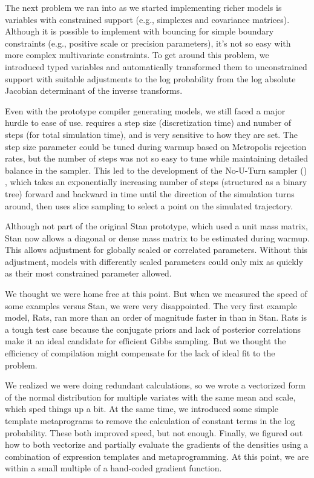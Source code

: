 The next problem we ran into as we started implementing richer models
is variables with constrained support (e.g., simplexes and covariance
matrices).  Although it is possible to implement \HMC with bouncing
for simple boundary constraints (e.g., positive scale or precision
parameters), it's not so easy with more complex multivariate
constraints.  To get around this problem, we introduced typed
variables and automatically transformed them to unconstrained support
with suitable adjustments to the log probability from the log absolute
Jacobian determinant of the inverse transforms.

Even with the prototype compiler generating models, we still faced a
major hurdle to ease of use.  \HMC requires a step size
(discretization time) and number of steps (for total simulation time),
and is very sensitive to how they are set.  The step size parameter
could be tuned during warmup based on Metropolis rejection rates, but
the number of steps was not so easy to tune while maintaining detailed
balance in the sampler.  This led to the development of the No-U-Turn
sampler (\NUTS) \citep{Hoffman-Gelman:2011, Hoffman-Gelman:2014},
which takes an exponentially increasing number of steps (structured as
a binary tree) forward and backward in time until the direction of the
simulation turns around, then uses slice sampling to select a point on
the simulated trajectory.

Although not part of the original Stan prototype, which used a unit
mass matrix, Stan now allows a diagonal or dense mass matrix to be
estimated during warmup.  This allows adjustment for globally scaled
or correlated parameters.  Without this adjustment, models with
differently scaled parameters could only mix as quickly as their most
constrained parameter allowed.

We thought we were home free at this point.  But when we measured the
speed of some \BUGS examples versus Stan, we were very disappointed.
The very first example model, Rats, ran more than an order of
magnitude faster in \JAGS than in Stan.  Rats is a tough test case
because the conjugate priors and lack of posterior correlations make
it an ideal candidate for efficient Gibbs sampling.  But we thought
the efficiency of compilation might compensate for the lack of ideal
fit to the problem.

We realized we were doing redundant calculations, so we wrote a
vectorized form of the normal distribution for multiple variates with
the same mean and scale, which sped things up a bit. At the same time,
we introduced some simple template metaprograms to remove the
calculation of constant terms in the log probability.  These both
improved speed, but not enough.  Finally, we figured out how to both
vectorize and partially evaluate the gradients of the densities using
a combination of expression templates and metaprogramming.  At this
point, we are within a small multiple of a hand-coded gradient
function.

